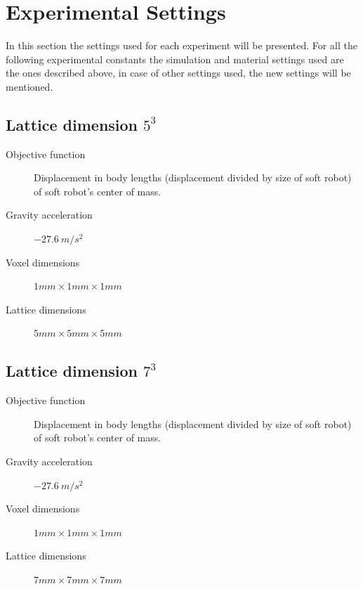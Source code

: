 \chapter{Experimental Settings} %
\label{ExperimentalSettings} %


In this section the settings used for each experiment will be presented. For all the following experimental constants the simulation and material settings used are the ones described above, in case of other settings used, the new settings will be mentioned.
\section{Lattice dimension $5^3$}
\label{Settings-size5}
\begin{small}
\begin{description}
\item[Objective function]{Displacement in body lengths (displacement divided by size of soft robot) of soft robot's center of mass.}
\item[Gravity acceleration]{$-27.6\ m/s^2$}
\item[Voxel dimensions]{$1mm \times 1mm \times 1mm$}
\item[Lattice dimensions]{$5mm \times 5mm \times 5mm$}
\end{description}
\end{small}

\section{Lattice dimension $7^3$}
\label{Settings-size7}
\begin{small}
\begin{description}
\item[Objective function]{Displacement in body lengths (displacement divided by size of soft robot) of soft robot's center of mass.}
\item[Gravity acceleration]{$-27.6\ m/s^2$}
\item[Voxel dimensions]{$1mm \times 1mm \times 1mm$}
\item[Lattice dimensions]{$7mm \times 7mm \times 7mm$}
\end{description}
\end{small}

